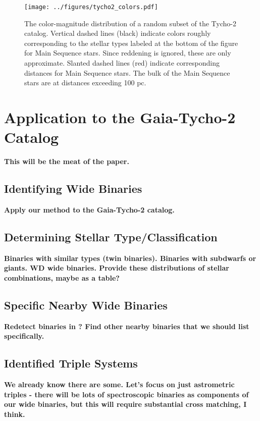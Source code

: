 \documentclass[usenatbib]{mnras}
\begin{document}
 
 
 
\begin{figure}[h!]
\begin{center}
\texttt{[image: ../figures/tycho2\_colors.pdf]}
\caption{ The color-magnitude distribution of a random subset of the Tycho-2 catalog. Vertical dashed lines (black) indicate colors roughly corresponding to the stellar types labeled at the bottom of the figure for Main Sequence stars. Since reddening is ignored, these are only approximate. Slanted dashed lines (red) indicate corresponding distances for Main Sequence stars. The bulk of the Main Sequence stars are at distances exceeding 100 pc.}
\label{fig:tycho-2_color_mag}
\end{center}
\end{figure}





\section{Application to the Gaia-Tycho-2 Catalog}

{\bf This will be the meat of the paper.}

\subsection{Identifying Wide Binaries}
{\bf Apply our method to the Gaia-Tycho-2 catalog.}

\subsection{Determining Stellar Type/Classification}
{\bf Binaries with similar types (twin binaries). Binaries with subdwarfs or giants. WD wide binaries. Provide these distributions of stellar combinations, maybe as a table?}

\subsection{Specific Nearby Wide Binaries}
{\bf Redetect binaries in \citet{shaya11}? Find other nearby binaries that we should list specifically.}

\subsection{Identified Triple Systems} 
{\bf We already know there are some. Let's focus on just astrometric triples - there will be lots of spectroscopic binaries as components of our wide binaries, but this will require substantial cross matching, I think.}
\end{document}
